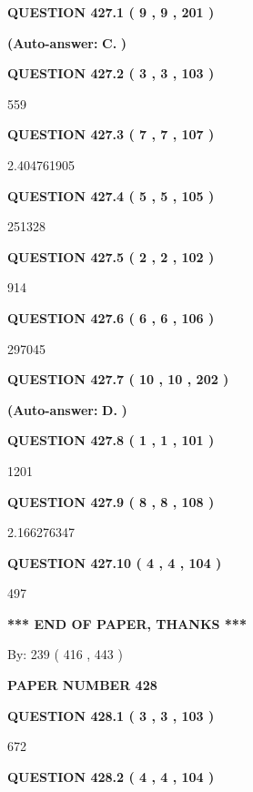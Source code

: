 \documentclass{ctexart}
\begin{document}
   
  
  
{\textbf{\large{QUESTION
427.1 
 ( 9 , 9 , 201 )
}}}
 
 
{\textbf{(Auto-answer:}}
{\textbf{\large{
C.}}}
{\textbf{)}}
 
 
  
  
{\textbf{\large{QUESTION
427.2 
 ( 3 , 3 , 103 )
}}}

559
  
  
{\textbf{\large{QUESTION
427.3 
 ( 7 , 7 , 107 )
}}}

2.404761905
  
  
{\textbf{\large{QUESTION
427.4 
 ( 5 , 5 , 105 )
}}}

251328
  
  
{\textbf{\large{QUESTION
427.5 
 ( 2 , 2 , 102 )
}}}

914
  
  
{\textbf{\large{QUESTION
427.6 
 ( 6 , 6 , 106 )
}}}

297045
  
  
{\textbf{\large{QUESTION
427.7 
 ( 10 , 10 , 202 )
}}}
 
 
{\textbf{(Auto-answer:}}
{\textbf{\large{
D.}}}
{\textbf{)}}
 
 
  
  
{\textbf{\large{QUESTION
427.8 
 ( 1 , 1 , 101 )
}}}

1201
  
  
{\textbf{\large{QUESTION
427.9 
 ( 8 , 8 , 108 )
}}}

2.166276347
  
  
{\textbf{\large{QUESTION
427.10 
 ( 4 , 4 , 104 )
}}}

497
   
   
   
   
\vspace{1.0in} 
{\textbf{\large{ *** END OF PAPER, THANKS *** }}} 
   
   
\hspace{1.0in} By: 
 239 ( 416 ,  443 )
   
   
   
   
\newpage 
\setcounter{page}{ 
   428001 } 
   
   
 {\textbf{ \Large{ PAPER NUMBER  428  }}}
   
   
   
   
  
  
{\textbf{\large{QUESTION
428.1 
 ( 3 , 3 , 103 )
}}}

672
  
  
{\textbf{\large{QUESTION
428.2 
 ( 4 , 4 , 104 )
}}}
\end{document}
